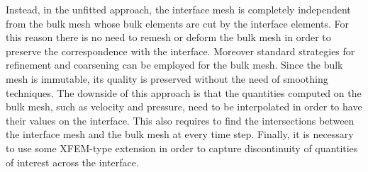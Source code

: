 Instead, in the unfitted approach, the interface mesh is completely independent
from the bulk mesh whose bulk elements are cut by the interface elements. For
this reason there is no need to remesh or deform the bulk mesh in order to
preserve the correspondence with the interface. Moreover standard strategies
for refinement and coarsening can be employed for the bulk mesh. Since the bulk
mesh is immutable, its quality is preserved without the need of smoothing
techniques. The downside of this approach is that the quantities computed on
the bulk mesh, such as velocity and pressure, need to be interpolated in order
to have their values on the interface. This also requires to find the
intersections between the interface mesh and the bulk mesh at every time step.
Finally, it is necessary to use some XFEM-type extension in order to capture
discontinuity of quantities of interest across the interface.

